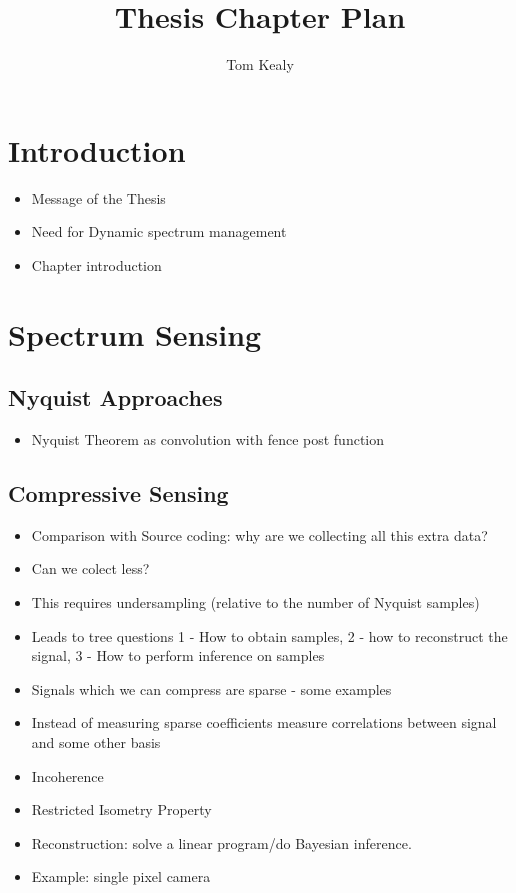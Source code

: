 \documentclass{article}
\title{Thesis Chapter Plan}
\author{Tom Kealy}
\begin{document}
\maketitle
\tableofcontents

\section{Introduction}
\begin{itemize}
\item Message of the Thesis
\end{itemize}

\begin{itemize}
\item Need for Dynamic spectrum management
\item Chapter introduction
\end{itemize}

\section{Spectrum Sensing}

\subsection{Nyquist Approaches}
\begin{itemize}
\item Nyquist Theorem as convolution with fence post function
\end{itemize}



\subsection{Compressive Sensing}
\begin{itemize}
\item Comparison with Source coding: why are we collecting all this extra data?
\item Can we colect less?
\item This requires undersampling (relative to the number of Nyquist samples)
\item Leads to tree questions 1 - How to obtain samples, 2 - how to reconstruct the signal, 3 - How to perform inference on samples
\item Signals which we can compress are sparse - some examples
\item Instead of measuring sparse coefficients measure correlations between signal and some other basis
\item Incoherence
\item Restricted Isometry Property
\item Reconstruction: solve a linear program/do Bayesian inference.
\item Example: single pixel camera
\end{itemize}
\end{document}
